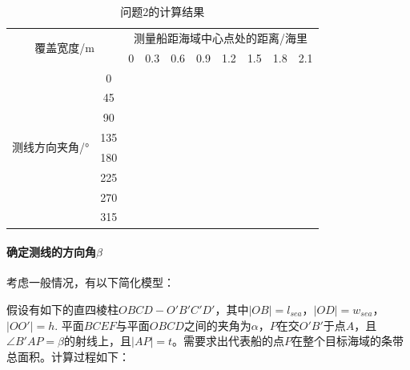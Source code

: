 \begin{table}[h]
    \centering
    \caption{问题2的计算结果}
    \begin{tabular}{cccccccccc}
    \hline
    \multicolumn{2}{c}{\multirow{2}{*}{覆盖宽度/m}} & \multicolumn{8}{c}{测量船距海域中心点处的距离/海里}        \\ \cline{3-10} 
    \multicolumn{2}{c}{}                        & 0 & 0.3 & 0.6 & 0.9 & 1.2 & 1.5 & 1.8 & 2.1 \\ \hline
    \multirow{8}{*}{测线方向夹角/°}       & 0         &   &     &     &     &     &     &     &     \\
                                    & 45        &   &     &     &     &     &     &     &     \\
                                    & 90        &   &     &     &     &     &     &     &     \\
                                    & 135       &   &     &     &     &     &     &     &     \\
                                    & 180       &   &     &     &     &     &     &     &     \\
                                    & 225       &   &     &     &     &     &     &     &     \\
                                    & 270       &   &     &     &     &     &     &     &     \\
                                    & 315       &   &     &     &     &     &     &     &     \\ \hline
    \end{tabular}
\end{table}



\paragraph{确定测线的方向角$\beta$}

考虑一般情况，有以下简化模型：

假设有如下的直四棱柱$OBCD - O'B'C'D'$，其中$|OB| = l_{sea}$，$|OD| = w_{sea}$，$|OO'| = h$. 平面$BCEF$与平面$OBCD$之间的夹角为$\alpha$，$P$在交$O'B'$于点$A$，且$\angle B'AP = \beta$的射线上，且$|AP| = t$。需要求出代表船的点$P$在整个目标海域的条带总面积。计算过程如下：

